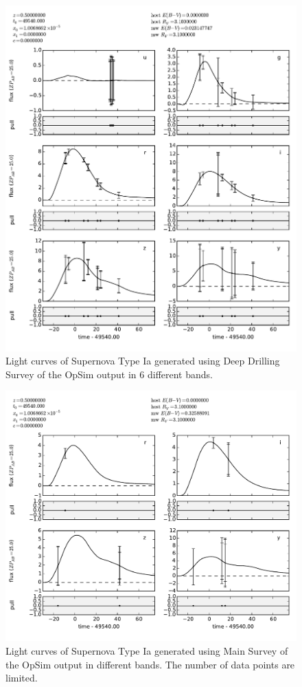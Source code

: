 \begin{figure}[tbh!]
\includegraphics[angle=0,width=0.99\hsize:,clip]{figs/SN_290_lc.pdf}
\caption{Light curves of Supernova Type Ia generated using Deep Drilling Survey of the OpSim output in 6 different bands.
}
\label{fig:SNIaLCopsimdeep}
\end{figure}



\begin{figure}[tbh!]
\includegraphics[angle=0,width=0.99\hsize:,clip]{figs/SN_309_lc.pdf}
\caption{Light curves of Supernova Type Ia generated using Main Survey of the OpSim output in different bands. The number of data points are limited. 
}
\label{fig:SNIaLCopsimmain}
\end{figure}

